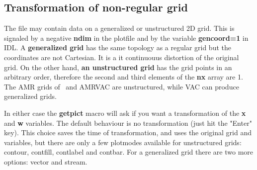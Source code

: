 \subsection{Transformation of non-regular grid \label{s-transform}}

   The file may contain data on a generalized or unstructured 2D grid.
   This is signaled by a negative {\bf ndim} in the plotfile 
   and by the variable {\bf gencoord=1} in IDL.
   A {\bf generalized grid} has the same topology as a regular grid
   but the coordinates are not Cartesian. It is a {it continuouus}
   distortion of the original grid. On the other hand, 
   {\bf an unstructured grid} has the grid points in an arbitrary
   order, therefore the second and third elements of the 
   {\bf nx} array are 1. The AMR grids of \BATSRUS\ and AMRVAC are
   unstructured, while VAC can produce generalized grids.

   In either case the {\bf getpict} macro will ask if you want a
   transformation of the {\bf x} and {\bf w} variables.
   The default behaviour is no transformation (just hit the "Enter" key).
   This choice saves the time of transformation, and uses the original grid 
   and variables, but there are only a few plotmodes available for 
   unstructured grids: contour, contfill, contlabel and contbar.
   For a generalized grid there are two more options: vector and stream.


